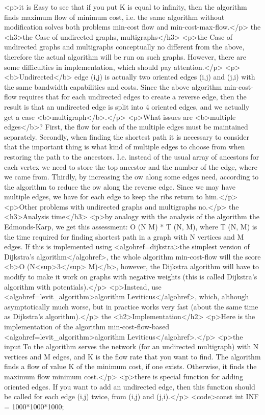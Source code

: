 <p>it is Easy to see that if you put K is equal to infinity, then the algorithm finds maximum flow of minimum cost, i.e. the same algorithm without modification solves both problems min-cost flow and min-cost-max-flow.</p>
the <h3>the Case of undirected graphs, multigraphs</h3>
<p>the Case of undirected graphs and multigraphs conceptually no different from the above, therefore the actual algorithm will be run on such graphs. However, there are some difficulties in implementation, which should pay attention.</p>
<p><b>Undirected</b> edge (i,j) is actually two oriented edges (i,j) and (j,i) with the same bandwidth capabilities and costs. Since the above algorithm min-cost-flow requires that for each undirected edges to create a reverse edge, then the result is that an undirected edge is split into 4 oriented edges, and we actually get a case <b>multigraph</b>.</p>
<p>What issues are <b>multiple edges</b>? First, the flow for each of the multiple edges must be maintained separately. Secondly, when finding the shortest path it is necessary to consider that the important thing is what kind of multiple edges to choose from when restoring the path to the ancestors. I.e. instead of the usual array of ancestors for each vertex we need to store the top ancestor and the number of the edge, where we came from. Thirdly, by increasing the ow along some edges need, according to the algorithm to reduce the ow along the reverse edge. Since we may have multiple edges, we have for each edge to keep the ribs return to him.</p>
<p>Other problems with undirected graphs and multigraphs no.</p>
the <h3>Analysis time</h3>
<p>by analogy with the analysis of the algorithm the Edmonds-Karp, we get this assessment: O (N M) * T (N, M), where T (N, M) is the time required for finding shortest path in a graph with N vertices and M edges. If this is implemented using <algohref=dijkstra>the simplest version of Dijkstra's algorithm</algohref>, the whole algorithm min-cost-flow will the score <b>O (N<sup>3</sup> M)</b>, however, the Dijkstra algorithm will have to modify to make it work on graphs with negative weights (this is called Dijkstra's algorithm with potentials).</p>
<p>Instead, use <algohref=levit_algorithm>algorithm Leviticus</algohref>, which, although asymptotically much worse, but in practice works very fast (about the same time as Dijkstra's algorithm).</p>
the <h2>Implementation</h2>
<p>Here is the implementation of the algorithm min-cost-flow-based <algohref=levit_algorithm>algorithm Leviticus</algohref>.</p>
<p>the input To the algorithm serves the network (for an undirected multigraph) with N vertices and M edges, and K is the flow rate that you want to find. The algorithm finds a flow of value K of the minimum cost, if one exists. Otherwise, it finds the maximum flow minimum cost.</p>
<p>there is special function for adding oriented edges. If you want to add an undirected edge, then this function should be called for each edge (i,j) twice, from (i,j) and (j,i).</p>
<code>const int INF = 1000*1000*1000;

